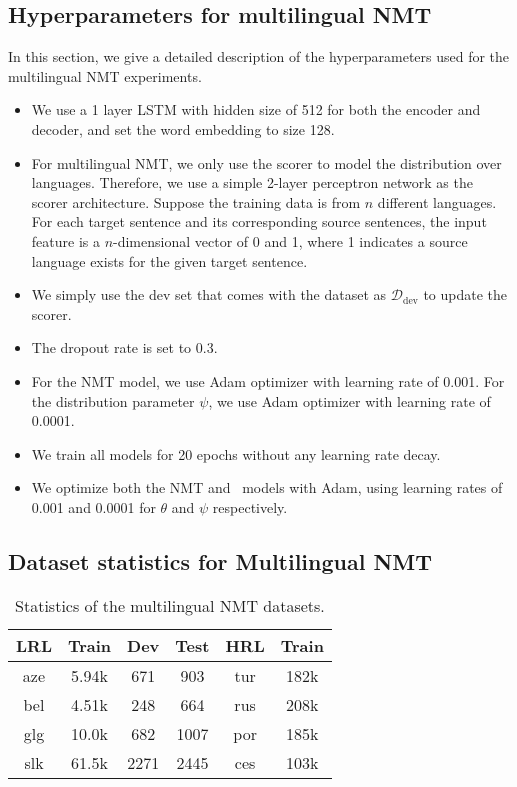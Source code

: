 \subsection{\label{app:nmt_hparam} Hyperparameters for multilingual NMT}
In this section, we give a detailed description of the hyperparameters used for the multilingual NMT experiments.
\begin{itemize}
    \item We use a 1 layer LSTM with hidden size of 512 for both the encoder and decoder, and set the word embedding to size 128.
    \item For multilingual NMT, we only use the scorer to model the distribution over languages. Therefore, we use a simple 2-layer perceptron network as the scorer architecture. Suppose the training data is from $n$ different languages. For each target sentence and its corresponding source sentences, the input feature is a $n$-dimensional vector of 0 and 1, where 1 indicates a source language exists for the given target sentence.
    \item We simply use the dev set that comes with the dataset as $\mathcal{D}_\text{dev}$ to update the scorer.
    \item The dropout rate is set to 0.3.
    \item For the NMT model, we use Adam optimizer with learning rate of 0.001. For the distribution parameter $\psi$, we use Adam optimizer with learning rate of 0.0001.
    \item We train all models for 20 epochs without any learning rate decay.
    \item We optimize both the NMT and \dds~models with Adam, using learning rates of 0.001 and 0.0001 for $\theta$ and $\psi$ respectively.
\end{itemize}

\subsection{\label{app:nmt_data} Dataset statistics for Multilingual NMT}
\begin{table}[H]
  \centering
  \begin{tabular}{c|ccc|cc}
  \toprule
  \textbf{LRL} & \textbf{Train} & \textbf{Dev} & \textbf{Test} & \textbf{HRL} & \textbf{Train} \\
  \midrule
  aze & 5.94k &  671 &  903 & tur & 182k \\
  bel & 4.51k &  248 &  664 & rus & 208k \\
  glg & 10.0k &  682 & 1007 & por & 185k \\
  slk & 61.5k & 2271 & 2445 & ces & 103k \\
  \bottomrule
  \end{tabular}
  \vspace{0.2cm}
  \caption{\label{tab:nmt_data}Statistics of the multilingual NMT datasets.}
\end{table} 


